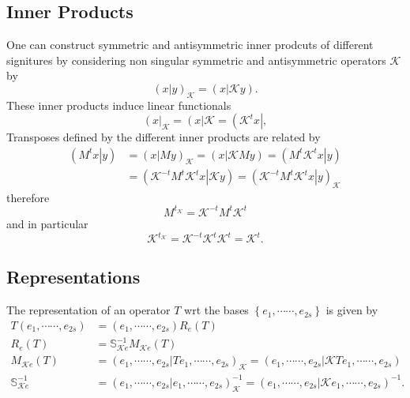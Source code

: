 \documentclass[aps,preprint]{revtex4}%
\begin{document}
\subsection{Inner Products}

\qquad One can construct symmetric and antisymmetric inner prodcuts of
different signitures by considering non singular symmetric and antisymmetric
operators $\mathcal{K}$ by%
\begin{equation}
\left(  \left.  x\right\vert y\right)  _{\mathcal{K}}=\left(  \left.
x\right\vert \mathcal{K}y\right)  .
\end{equation}
These inner products induce linear functionals
\begin{equation}
\left(  x\right\vert _{\mathcal{K}}=\left(  x\right\vert \mathcal{K}=\left(
\mathcal{K}^{t}x\right\vert ,
\end{equation}
Transposes defined by the different inner products are related by
\begin{align}
\left(  \left.  M^{t}x\right\vert y\right)   &  =\left(  \left.  x\right\vert
My\right)  _{\mathcal{K}}=\left(  \left.  x\right\vert \mathcal{K}My\right)
=\left(  \left.  M^{t}\mathcal{K}^{t}x\right\vert y\right) \\
&  =\left(  \left.  \mathcal{K}^{-t}M^{t}\mathcal{K}^{t}x\right\vert
\mathcal{K}y\right)  =\left(  \left.  \mathcal{K}^{-t}M^{t}\mathcal{K}%
^{t}x\right\vert y\right)  _{\mathcal{K}}%
\end{align}
therefore
\begin{equation}
M^{t_{\mathcal{K}}}=\mathcal{K}^{-t}M^{t}\mathcal{K}^{t}%
\end{equation}
and in particular
\begin{equation}
\mathcal{K}^{t_{\mathcal{K}}}=\mathcal{K}^{-t}\mathcal{K}^{t}\mathcal{K}%
^{t}=\mathcal{K}^{t}.
\end{equation}


\subsection{Representations}

The representation of an operator $T$ wrt the bases $\left\{  e_{1}%
,\cdots\cdots,e_{2s}\right\}  $ is given by
\begin{align}
T\left(  e_{1},\cdots\cdots,e_{2s}\right)   &  =\left(  e_{1},\cdots
\cdots,e_{2s}\right)  R_{e}\left(  T\right) \\
R_{e}\left(  T\right)   &  =\mathbb{S}_{\mathcal{K}e}^{-1}M_{\mathcal{K}%
e}\left(  T\right) \\
M_{\mathcal{K}e}\left(  T\right)   &  =\left(  e_{1},\cdots\cdots
,e_{2s}\left\vert Te_{1},\cdots\cdots,e_{2s}\right.  \right)  _{\mathcal{K}%
}=\left(  e_{1},\cdots\cdots,e_{2s}\left\vert \mathcal{K}Te_{1},\cdots
\cdots,e_{2s}\right.  \right) \\
\mathbb{S}_{\mathcal{K}e}^{-1}  &  =\left(  e_{1},\cdots\cdots,e_{2s}%
\left\vert e_{1},\cdots\cdots,e_{2s}\right.  \right)  _{\mathcal{K}}%
^{-1}=\left(  e_{1},\cdots\cdots,e_{2s}\left\vert \mathcal{K}e_{1}%
,\cdots\cdots,e_{2s}\right.  \right)  ^{-1}.
\end{align}
\end{document}
